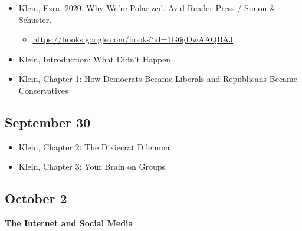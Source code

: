 \documentclass[]{tufte-handout}
\providecommand{\tightlist}{%
  \setlength{\itemsep}{0pt}\setlength{\parskip}{0pt}}
\begin{document}
\begin{itemize}
\tightlist
\item
  Klein, Ezra. 2020. Why We're Polarized. Avid Reader Press / Simon \&
  Schuster.

  \begin{itemize}
  \tightlist
  \item
    \url{https://books.google.com/books?id=1G6gDwAAQBAJ}
  \end{itemize}
\item
  Klein, Introduction: What Didn't Happen
\item
  Klein, Chapter 1: How Democrats Became Liberals and Republicans Became
  Conservatives
\end{itemize}

\hypertarget{september-30}{%
\subsection{September 30}\label{september-30}}

\begin{itemize}
\tightlist
\item
  Klein, Chapter 2: The Dixiecrat Dilemma
\item
  Klein, Chapter 3: Your Brain on Groups
\end{itemize}

\hypertarget{october-2}{%
\subsection{October 2}\label{october-2}}

\textbf{The Internet and Social Media}
\end{document}
